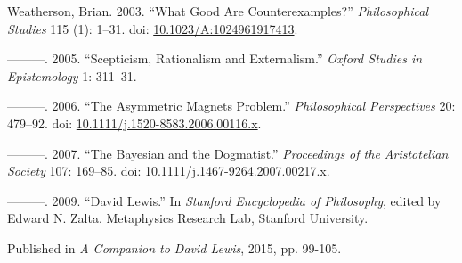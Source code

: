 \documentclass[
  10pt,
  letterpaper,
  DIV=11,
  numbers=noendperiod,
  twoside]{scrartcl}
\newlength{\cslhangindent}
\newenvironment{CSLReferences}[2] %
 {\begin{list}{}{%
  \setlength{\itemindent}{0pt}
  \setlength{\leftmargin}{0pt}
  \setlength{\parsep}{0pt}
  \ifodd #1
   \setlength{\leftmargin}{\cslhangindent}
   \setlength{\itemindent}{-1\cslhangindent}
  \fi
  \setlength{\itemsep}{#2\baselineskip}}}
 {\end{list}}
\begin{document}
\begin{CSLReferences}{1}{0}
Weatherson, Brian. 2003. {``{What Good Are Counterexamples?}''}
\emph{Philosophical Studies} 115 (1): 1--31. doi:
\href{https://doi.org/10.1023/A:1024961917413}{10.1023/A:1024961917413}.

---------. 2005. {``Scepticism, Rationalism and Externalism.''}
\emph{Oxford Studies in Epistemology} 1: 311--31.

---------. 2006. {``{The Asymmetric Magnets Problem}.''}
\emph{Philosophical Perspectives} 20: 479--92. doi:
\href{https://doi.org/10.1111/j.1520-8583.2006.00116.x}{10.1111/j.1520-8583.2006.00116.x}.

---------. 2007. {``The Bayesian and the Dogmatist.''} \emph{Proceedings
of the Aristotelian Society} 107: 169--85. doi:
\href{https://doi.org/10.1111/j.1467-9264.2007.00217.x}{10.1111/j.1467-9264.2007.00217.x}.

---------. 2009. {``{David Lewis}.''} In \emph{Stanford Encyclopedia of
Philosophy}, edited by Edward N. Zalta. Metaphysics Research Lab,
Stanford University.

\end{CSLReferences}



\noindent Published in\emph{
A Companion to David Lewis}, 2015, pp. 99-105.
\end{document}
